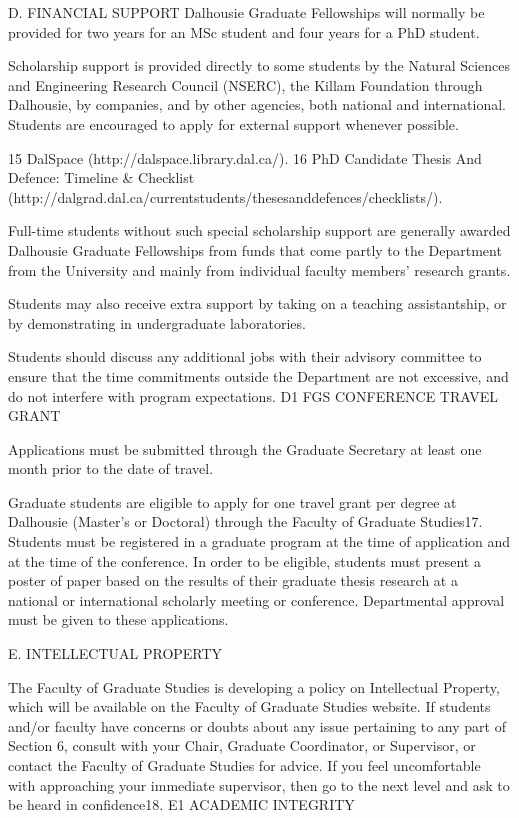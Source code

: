 D.	FINANCIAL  SUPPORT
Dalhousie Graduate Fellowships will normally be provided for two years for an MSc student and four years for a PhD student.

Scholarship support is provided directly to some students by the Natural Sciences and Engineering Research Council (NSERC), the Killam Foundation through Dalhousie, by companies, and by other agencies, both national and international. Students are encouraged to apply for external support whenever possible.


15 DalSpace (http://dalspace.library.dal.ca/).
16 PhD Candidate Thesis And Defence: Timeline & Checklist (http://dalgrad.dal.ca/currentstudents/thesesanddefences/checklists/).
 

Full-time students without such special scholarship support are generally awarded Dalhousie Graduate Fellowships from funds that come partly to the Department from the University and mainly from individual faculty members’ research grants.

Students may also receive extra support by taking on a teaching assistantship, or by demonstrating in undergraduate laboratories.

Students should discuss any additional jobs with their advisory committee to ensure that the time commitments outside the Department are not excessive, and do not interfere with program expectations.
D1	FGS CONFERENCE TRAVEL GRANT

Applications must be submitted through the Graduate Secretary at least one month prior to the date of travel.

Graduate students are eligible to apply for one travel grant per degree at Dalhousie (Master’s or Doctoral) through the Faculty of Graduate Studies17. Students must be registered in a graduate program at the time of application and at the time of the conference. In order to be eligible, students must present a poster of paper based on the results of their graduate thesis research at a national or international scholarly meeting or conference. Departmental approval must be given to these applications.


E.	INTELLECTUAL  PROPERTY

The Faculty of Graduate Studies is developing a policy on Intellectual Property, which will be available on the Faculty of Graduate Studies website.
If students and/or faculty have concerns or doubts about any issue pertaining to any part of Section 6, consult with your Chair, Graduate Coordinator, or Supervisor, or contact the Faculty of Graduate Studies for advice. If you feel uncomfortable with approaching your immediate supervisor, then go to the next level and ask to be heard in confidence18.
E1	ACADEMIC INTEGRITY

